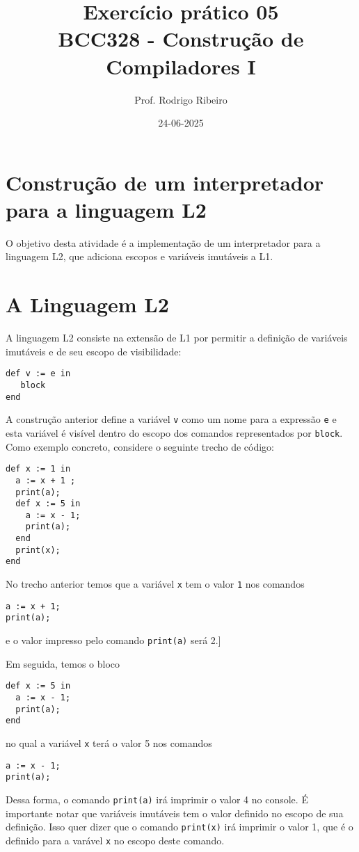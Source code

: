 \documentclass[a4paper,11pt]{article}
\author{Prof. Rodrigo Ribeiro}
\date{24-06-2025}
\title{Exercício prático 05\\\medskip
\large BCC328 - Construção de Compiladores I}
\begin{document}
\maketitle
\section*{Construção de um interpretador para a linguagem L2}
\label{sec:orgfd15ec3}

O objetivo desta atividade é a implementação de um interpretador para  a linguagem L2,
que adiciona escopos e variáveis imutáveis a L1.
\section*{A Linguagem L2}
\label{sec:orgce14ced}

A linguagem L2 consiste na extensão de L1 por permitir a definição de variáveis imutáveis
e de seu escopo de visibilidade:

\begin{verbatim}
def v := e in
   block
end
\end{verbatim}

A construção anterior define a variável \texttt{v} como um nome para a expressão \texttt{e} e esta variável
é visível dentro do escopo dos comandos representados por \texttt{block}. Como exemplo concreto,
considere o seguinte trecho de código:

\begin{verbatim}
def x := 1 in
  a := x + 1 ;
  print(a);
  def x := 5 in
    a := x - 1;
    print(a);
  end
  print(x);
end
\end{verbatim}

No trecho anterior temos que a variável \texttt{x} tem o valor \texttt{1} nos comandos
\begin{verbatim}
a := x + 1;
print(a);
\end{verbatim}
e o valor impresso pelo comando \texttt{print(a)} será 2.]

Em seguida, temos o bloco

\begin{verbatim}
def x := 5 in
  a := x - 1;
  print(a);
end
\end{verbatim}
no qual a variável \texttt{x} terá o valor 5 nos comandos
\begin{verbatim}
a := x - 1;
print(a);
\end{verbatim}
Dessa forma, o comando \texttt{print(a)} irá imprimir o valor 4 no console.
É importante notar que variáveis imutáveis tem o valor definido no
escopo de sua definição. Isso quer dizer que o comando \texttt{print(x)}
irá imprimir o valor 1, que é o definido para a varável \texttt{x} no escopo
deste comando.
\end{document}
